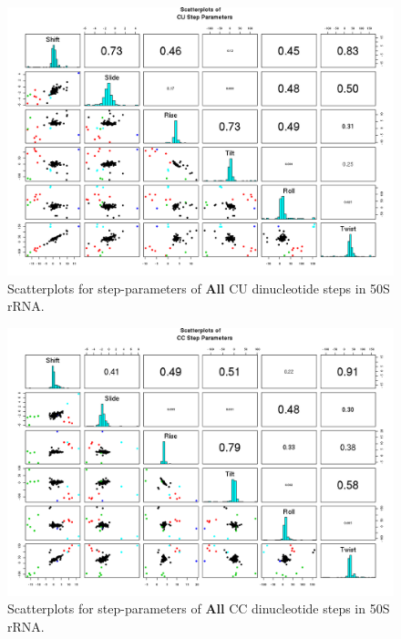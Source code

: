 \begin{figure}[H]
\centering
\includegraphics[angle=90, scale=0.6]{All/CU.png}
\caption{Scatterplots for step-parameters of \textbf{All} CU dinucleotide steps
in 50S rRNA.}
\label{fig:stepsCU}
\end{figure}

\begin{figure}[H]
\centering
\includegraphics[angle=90, scale=0.6]{All/CC.png}
\caption{Scatterplots for step-parameters of \textbf{All} CC dinucleotide steps
in 50S rRNA.}
\label{fig:stepsCC}
\end{figure}

